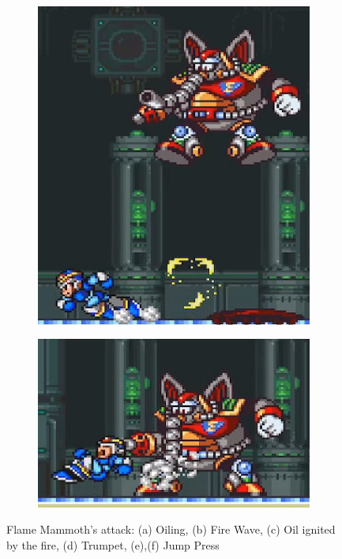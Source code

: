 	\begin{figure}
	\ContinuedFloat
	\centering
	\begin{subfigure}{0.4\textwidth}
		\centering
		\includegraphics[width=\linewidth]{figures/X1/Mammoth_press_1.jpg}
		\caption{}
	\end{subfigure}
	\begin{subfigure}{0.5\textwidth}
		\centering
		\includegraphics[width=\linewidth]{figures/X1/Mammoth_press_2.jpg}
		\caption{}
	\end{subfigure}
	\caption{Flame Mammoth's attack: (a) Oiling, (b) Fire Wave, (c) Oil ignited by the fire, (d) Trumpet, (e),(f) Jump Press }
\end{figure}

